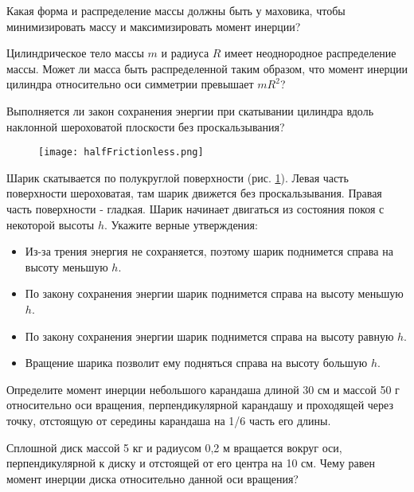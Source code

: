 \begin{ex}
Какая форма и распределение массы должны быть у маховика, чтобы минимизировать массу и максимизировать момент инерции?
\end{ex}	

\begin{ex}
Цилиндрическое тело массы $m$ и радиуса $R$ имеет неоднородное распределение массы. Может ли масса быть распределенной таким образом, что момент инерции цилиндра относительно оси симметрии превышает $mR^2$? 
\end{ex}	

\begin{ex}
Выполняется ли закон сохранения энергии при скатывании цилиндра вдоль наклонной шероховатой плоскости без проскальзывания?
\end{ex}	

\begin{figure}[h]
\centering
\texttt{[image: halfFrictionless.png]}
\caption{}
\label{halfFrictionless}
\end{figure}

\begin{ex}
Шарик скатывается по полукруглой поверхности (рис. \ref{halfFrictionless}). Левая часть поверхности шероховатая, там шарик движется без проскальзывания. Правая часть поверхности - гладкая. Шарик начинает двигаться из состояния покоя с некоторой высоты $h$. Укажите верные утверждения:
\begin{itemize}
\item Из-за трения энергия не сохраняется, поэтому шарик поднимется справа на высоту меньшую $h$.
\item По закону сохранения энергии шарик поднимется справа на высоту меньшую $h$.
\item По закону сохранения энергии шарик поднимется справа на высоту равную $h$.
\item Вращение шарика позволит ему подняться справа на высоту большую $h$.
\end{itemize}
\end{ex}	

\simpleProblems

\begin{ex}
Определите момент инерции небольшого карандаша длиной 30 см и массой 50 г относительно оси вращения, перпендикулярной карандашу и проходящей через точку, отстоящую от середины карандаша на 1/6 часть его длины.
\end{ex}	

\begin{ex}
Сплошной диск массой 5 кг и радиусом 0,2 м вращается вокруг оси, перпендикулярной к диску и отстоящей от его центра на 10 см. Чему равен момент инерции диска относительно данной оси вращения?
\end{ex}	

